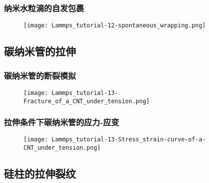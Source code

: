 \frame
{
	\frametitle{纳米水粒滴的自发包裹}
\begin{figure}[h!]
\centering
\vskip -5pt
\texttt{[image: Lammps\_tutorial-12-spontaneous\_wrapping.png]}
\caption{\fontsize{6.2pt}{5.2pt}}%
\label{LAMMPS_water-nanodroplet-spontaneous-wrapping-GNR}
\end{figure}
}

\subsection{碳纳米管的拉伸}


\frame
{
	\frametitle{碳纳米管的断裂模拟}
\begin{figure}[h!]
\centering
\vskip -5pt
\texttt{[image: Lammps\_tutorial-13-Fracture\_of\_a\_CNT\_under\_tension.png]}
\caption{\fontsize{6.2pt}{5.2pt}}%
\label{LAMMPS_Frcture-of-CNT-under_ternsion}
\end{figure}
}

\frame
{
	\frametitle{拉伸条件下碳纳米管的应力-应变}
\begin{figure}[h!]
\centering
\vskip -5pt
\texttt{[image: Lammps\_tutorial-13-Stress\_strain-curve-of-a-CNT\_under\_tension.png]}
\caption{\fontsize{6.2pt}{5.2pt}}%
\label{LAMMPS_Stress_strain-of-CNT_under_tension}
\end{figure}
}

\subsection{硅柱的拉伸裂纹}

